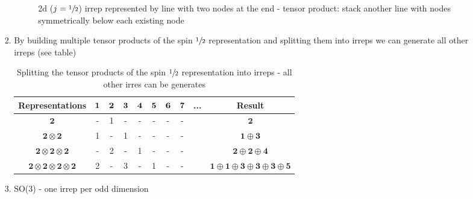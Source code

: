 \documentclass[../main.tex]{subfiles}
\begin{document}
\begin{itemize}
\begin{enumerate}
\begin{enumerate}
\begin{enumerate}
\begin{figure}[!ht]
\caption{2d ($j=\sfrac{1}{2}$) irrep represented by line with two nodes at the end - tensor product: stack another line with nodes symmetrically below each existing node}
\label{fig:my_label}
\end{figure}

\item By building multiple tensor products of the spin $\sfrac{1}{2}$ representation and splitting them into irreps we can generate all other irreps (see table)

\begin{table}[!h]
\centering
\begin{tabular}{c|ccccccccc}
Representations &$\bf{1}$&$\bf{2}$&$\bf{3}$&$\bf{4}$&$\bf{5}$&$\bf{6}$&$\bf{7}$&...&Result\\ \hline
$\mathbf{2}$         &-&1&-&-&-&-&-&&$\mathbf{2}$\\
$\mathbf{2\otimes2}$ &1&-&1&-&-&-&-&&$\mathbf{1\oplus3}$\\
$\mathbf{2\otimes2\otimes2}$ &-&2&-&1&-&-&-&&$\mathbf{2\oplus2\oplus4}$\\
$\mathbf{2\otimes2\otimes2\otimes2}$ &2&-&3&-&1&-&-&&$\mathbf{1\oplus1\oplus3\oplus3\oplus3\oplus5}$
\end{tabular}
\caption{Splitting the tensor products of the spin $\sfrac{1}{2}$ representation into irreps - all other irres can be generates}
\end{table}

\item SO(3) - one irrep per odd dimension


\end{enumerate}
\end{enumerate}
\end{enumerate}
\end{itemize}
\end{document}
